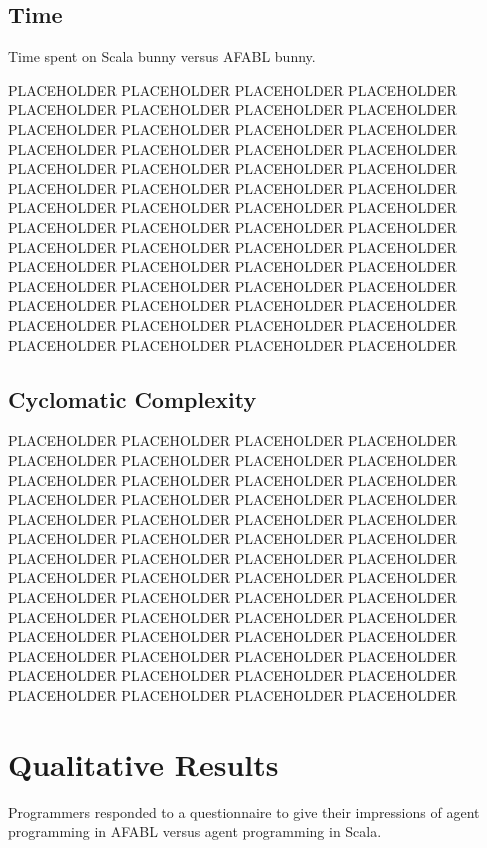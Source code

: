 \subsection{Time}

Time spent on Scala bunny versus AFABL bunny.

PLACEHOLDER PLACEHOLDER PLACEHOLDER PLACEHOLDER PLACEHOLDER PLACEHOLDER PLACEHOLDER PLACEHOLDER PLACEHOLDER PLACEHOLDER PLACEHOLDER PLACEHOLDER PLACEHOLDER PLACEHOLDER PLACEHOLDER PLACEHOLDER PLACEHOLDER PLACEHOLDER PLACEHOLDER PLACEHOLDER PLACEHOLDER PLACEHOLDER PLACEHOLDER PLACEHOLDER PLACEHOLDER PLACEHOLDER PLACEHOLDER PLACEHOLDER PLACEHOLDER PLACEHOLDER PLACEHOLDER PLACEHOLDER PLACEHOLDER PLACEHOLDER PLACEHOLDER PLACEHOLDER PLACEHOLDER PLACEHOLDER PLACEHOLDER PLACEHOLDER PLACEHOLDER PLACEHOLDER PLACEHOLDER PLACEHOLDER PLACEHOLDER PLACEHOLDER PLACEHOLDER PLACEHOLDER PLACEHOLDER PLACEHOLDER PLACEHOLDER PLACEHOLDER PLACEHOLDER PLACEHOLDER PLACEHOLDER PLACEHOLDER

\subsection{Cyclomatic Complexity}

PLACEHOLDER PLACEHOLDER PLACEHOLDER PLACEHOLDER PLACEHOLDER PLACEHOLDER PLACEHOLDER PLACEHOLDER PLACEHOLDER PLACEHOLDER PLACEHOLDER PLACEHOLDER PLACEHOLDER PLACEHOLDER PLACEHOLDER PLACEHOLDER PLACEHOLDER PLACEHOLDER PLACEHOLDER PLACEHOLDER PLACEHOLDER PLACEHOLDER PLACEHOLDER PLACEHOLDER PLACEHOLDER PLACEHOLDER PLACEHOLDER PLACEHOLDER PLACEHOLDER PLACEHOLDER PLACEHOLDER PLACEHOLDER PLACEHOLDER PLACEHOLDER PLACEHOLDER PLACEHOLDER PLACEHOLDER PLACEHOLDER PLACEHOLDER PLACEHOLDER PLACEHOLDER PLACEHOLDER PLACEHOLDER PLACEHOLDER PLACEHOLDER PLACEHOLDER PLACEHOLDER PLACEHOLDER PLACEHOLDER PLACEHOLDER PLACEHOLDER PLACEHOLDER PLACEHOLDER PLACEHOLDER PLACEHOLDER PLACEHOLDER

\section{Qualitative Results}

Programmers responded to a questionnaire to give their impressions of agent programming in AFABL versus agent programming in Scala.

